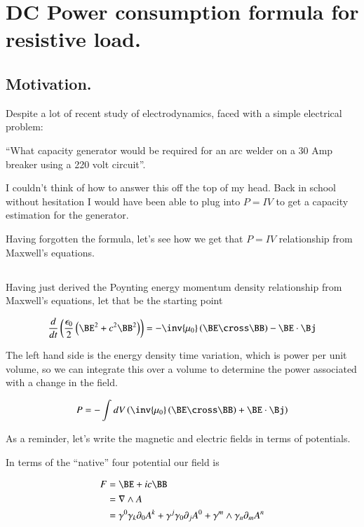 \chapter{DC Power consumption formula for resistive load.}
\date{ Jan 06, 2009.  $RCSfile: dcPower.tex,v $ Last $Revision: 1.7 $ $Date: 2009/06/11 16:45:58 $ }

\section{Motivation. }

Despite a lot of recent study of electrodynamics, faced with a simple electrical problem:

``What capacity generator would be required for an arc welder on a 30 Amp breaker using a 220 volt circuit''.

I couldn't think of how to answer this off the top of my head.  Back in school without hesitation I would have
been able to plug into $P = I V$ to get a capacity estimation for the generator.

Having forgotten the formula, let's see how we get that $P = I V$ relationship from Maxwell's equations.

\section{}

Having just derived the Poynting energy momentum density relationship from Maxwell's equations, let that be the starting
point

\begin{align*}
\frac{d}{dt}\left(\frac{\epsilon_0}{2}\left(\BE^2 + c^2\BB^2 \right) \right) = - \inv{\mu_0} \left(\BE \cross \BB \right) - \BE \cdot \Bj
\end{align*}

The left hand side is the energy density time variation, which is power per unit volume, so we can integrate this
over a volume to determine the power associated with a change in the field.

\begin{align*}
P = -\int dV \left( \inv{\mu_0} \left(\BE \cross \BB \right) + \BE \cdot \Bj \right)
\end{align*}

As a reminder, let's write the magnetic and electric fields in terms of potentials.

In terms of the ``native'' four potential our field is

\begin{align*}
F 
&= \BE + ic \BB \\
&= \grad \wedge A \\
&= \gamma^0 \gamma_k \partial_0 A^k + \gamma^j \gamma_0 \partial_j A^0 + \gamma^m \wedge \gamma_n \partial_m A^n \\
\end{align*}

